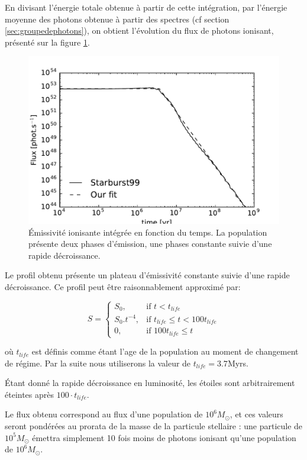 En divisant l'énergie totale obtenue à partir de cette intégration, par l'énergie moyenne des photons obtenue à partir des spectres (cf section \ref{sec:groupedephotons}), on obtient l'évolution du flux de photons ionisant, présenté sur la figure \ref{fig:flux}.
\begin{figure}
        \includegraphics[width=.95\linewidth]{img/03/flux.pdf} 
        \caption[Émissivité ionisante]{Émissivité ionisante intégrée en fonction du temps.
        La population présente deux phases d'émission, une phases constante suivie d'une rapide décroissance.
 		\label{fig:flux}}
\end{figure}
Le profil obtenu présente un plateau d'émissivité constante suivie d'une rapide décroissance.
Ce profil peut être raisonnablement approximé par:

\begin{equation}
    S = 
\begin{cases}
    S_0 ,         & \text{if } t < t_{life}\\
    S_0.t^{-4},   & \text{if } t_{life} \leq t < 100t_{life} \\
    0,   & \text{if } 100t_{life} \leq t
\end{cases}
\end{equation}

où $t_{life}$ est définis comme étant l'age de la population au moment de changement de régime.
Par la suite nous utiliserons la valeur de $t_{life} = 3.7$Myrs.

Étant donné la rapide décroissance en luminosité, les étoiles sont arbitrairement éteintes après $100 \cdot t_{life}$.

Le flux obtenu correspond au flux d'une population de $10^6M_\odot$, et ces valeurs seront pondérées au prorata de la masse de la particule stellaire : une particule de $10^5M_\odot$ émettra  simplement 10 fois moins de photons ionisant qu'une population de $10^6 M_\odot$.

